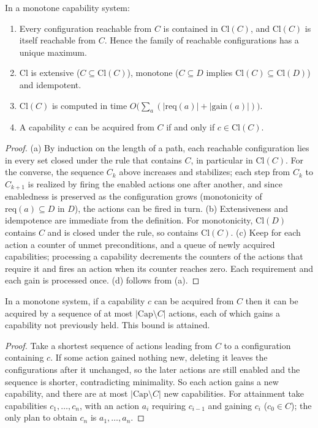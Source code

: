 \begin{newresult}\label{thm:closure}
In a monotone capability system:
\begin{enumerate}[nosep,label=(\alph*)]
  \item Every configuration reachable from $C$ is contained in $\mathrm{Cl}(C)$, and $\mathrm{Cl}(C)$ is itself reachable from $C$. Hence the family of reachable configurations has a unique maximum.
  \item $\mathrm{Cl}$ is extensive ($C\subseteq\mathrm{Cl}(C)$), monotone ($C\subseteq D$ implies $\mathrm{Cl}(C)\subseteq\mathrm{Cl}(D)$) and idempotent.
  \item $\mathrm{Cl}(C)$ is computed in time $O\bigl(\sum_a(|\mathrm{req}(a)|+|\mathrm{gain}(a)|)\bigr)$.
  \item A capability $c$ can be acquired from $C$ if and only if $c\in\mathrm{Cl}(C)$.
\end{enumerate}
\end{newresult}
\begin{proof}
(a) By induction on the length of a path, each reachable configuration lies in every set closed under the rule that contains $C$, in particular in $\mathrm{Cl}(C)$. For the converse, the sequence $C_k$ above increases and stabilizes; each step from $C_k$ to $C_{k+1}$ is realized by firing the enabled actions one after another, and since enabledness is preserved as the configuration grows (monotonicity of $\mathrm{req}(a)\subseteq D$ in $D$), the actions can be fired in turn. (b) Extensiveness and idempotence are immediate from the definition. For monotonicity, $\mathrm{Cl}(D)$ contains $C$ and is closed under the rule, so contains $\mathrm{Cl}(C)$. (c) Keep for each action a counter of unmet preconditions, and a queue of newly acquired capabilities; processing a capability decrements the counters of the actions that require it and fires an action when its counter reaches zero. Each requirement and each gain is processed once. (d) follows from (a).
\end{proof}

\begin{newresult}\label{prop:short-plan}
In a monotone system, if a capability $c$ can be acquired from $C$ then it can be acquired by a sequence of at most $|\mathrm{Cap}\setminus C|$ actions, each of which gains a capability not previously held. This bound is attained.
\end{newresult}
\begin{proof}
Take a shortest sequence of actions leading from $C$ to a configuration containing $c$. If some action gained nothing new, deleting it leaves the configurations after it unchanged, so the later actions are still enabled and the sequence is shorter, contradicting minimality. So each action gains a new capability, and there are at most $|\mathrm{Cap}\setminus C|$ new capabilities. For attainment take capabilities $c_1,\dots,c_n$, with an action $a_i$ requiring $c_{i-1}$ and gaining $c_i$ ($c_0\in C$); the only plan to obtain $c_n$ is $a_1,\dots,a_n$.
\end{proof}

